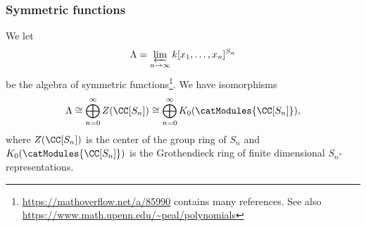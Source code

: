 \documentclass{ck-article}
\newcommand\SymGrp[1]{S_{#1}}
\begin{document}
\subsubsection{Symmetric functions}

We let
\[
    \Lambda = \varprojlim_{n \to \infty} k[x_1,\dotsc,x_n]^{\SymGrp n}
\]
be the algebra of symmetric functions\footnote{\url{https://mathoverflow.net/a/85990} contains many references. See also \url{https://www.math.upenn.edu/~peal/polynomials}}.
We have isomorphisms
\[
    \Lambda \cong 
    \bigoplus_{n=0}^\infty Z(\CC[\SymGrp n]) \cong
    \bigoplus_{n=0}^\infty K_0(\catModules{\CC[\SymGrp n]}),
\]
where $Z(\CC[\SymGrp n])$ is the center of the group ring of $\SymGrp n$ and $K_0(\catModules{\CC[\SymGrp n]})$ is the Grothendieck ring of finite dimensional $\SymGrp n$-representations.
\end{document}

